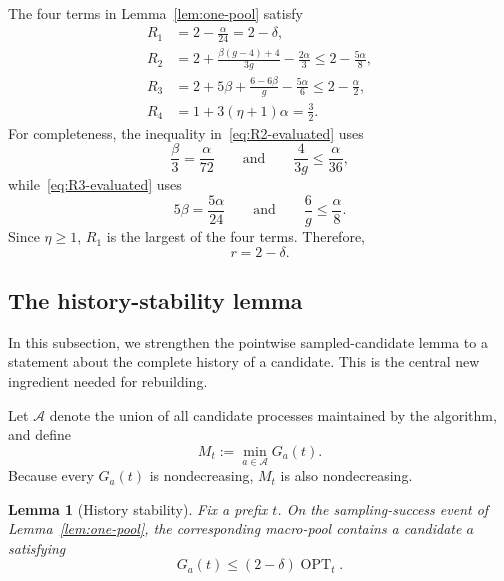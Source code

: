 \documentclass[11pt]{article}
\newtheorem{lemma}[theorem]{Lemma}
\theoremstyle{definition}
\theoremstyle{remark}
\newcommand{\A}{\mathcal A}
\newcommand{\OPT}{\operatorname{OPT}}
\newcommand{\1}{\mathbf 1}
\begin{document}
The four terms in Lemma~\ref{lem:one-pool} satisfy
\begin{align}
 R_1&=2-\frac{\alpha}{24}=2-\delta,
       \label{eq:R1-evaluated}\\
 R_2
 &=2+\frac{\beta(g-4)+4}{3g}-\frac{2\alpha}{3}
 \le2-\frac{5\alpha}{8},
       \label{eq:R2-evaluated}\\
 R_3
 &=2+5\beta+\frac{6-6\beta}{g}-\frac{5\alpha}{6}
 \le2-\frac{\alpha}{2},
       \label{eq:R3-evaluated}\\
 R_4&=1+3(\eta+1)\alpha=\frac32.
       \label{eq:R4-evaluated}
\end{align}
For completeness, the inequality in~\eqref{eq:R2-evaluated} uses
\[
 \frac{\beta}{3}=\frac{\alpha}{72}
 \qquad\text{and}\qquad
 \frac{4}{3g}\le\frac{\alpha}{36},
\]
while~\eqref{eq:R3-evaluated} uses
\[
 5\beta=\frac{5\alpha}{24}
 \qquad\text{and}\qquad
 \frac6g\le\frac{\alpha}{8}.
\]
Since $\eta\ge1$, $R_1$ is the largest of the four terms.  Therefore,
\begin{equation}\label{eq:r-subtwo}
  r=2-\delta.
\end{equation}

\subsection{The history-stability lemma}

In this subsection, we strengthen the pointwise sampled-candidate lemma to a
statement about the complete history of a candidate.  This is the central
new ingredient needed for rebuilding.

Let $\A$ denote the union of all candidate processes maintained by the
algorithm, and define
\begin{equation}\label{eq:M-definition}
  M_t:=\min_{a\in\A}G_a(t).
\end{equation}
Because every $G_a(t)$ is nondecreasing, $M_t$ is also nondecreasing.

\begin{lemma}[History stability]\label{lem:history-stability}
Fix a prefix $t$.  On the sampling-success event of
Lemma~\ref{lem:one-pool}, the corresponding macro-pool contains a candidate
$a$ satisfying
\begin{equation}\label{eq:history-good-candidate}
  G_a(t)\le(2-\delta)\OPT_t.
\end{equation}
\end{lemma}
\end{document}
